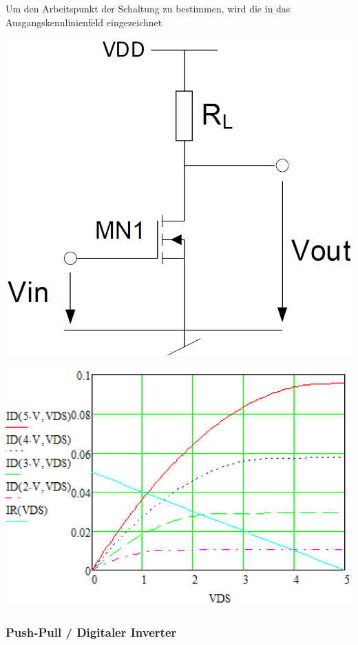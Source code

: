 Um den Arbeitspunkt der Schaltung zu bestimmen, wird die  in das
Ausgangskennlinienfeld eingezeichnet

\begin{minipage}[c]{0.4\columnwidth}
    \includegraphics[width=0.9\columnwidth]{images/source_schaltung.png}
\end{minipage}
\hfill
\begin{minipage}[c]{0.5\columnwidth}
    \includegraphics[width=\columnwidth]{images/source_schaltung_lastgerade.png}
\end{minipage}


\subsubsection{Push-Pull / Digitaler Inverter}  %

